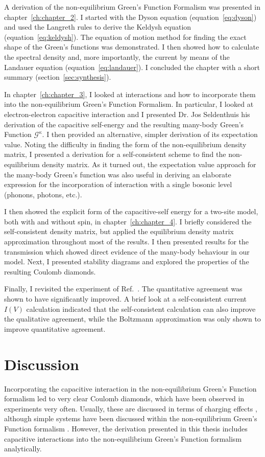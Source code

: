 A derivation of the non-equilibrium Green's Function Formalism was presented in chapter~\ref{ch:chapter_2}. I started with the Dyson equation (equation~\ref{eq:dyson}) and used the Langreth rules to derive the Keldysh equation (equation~\ref{eq:keldysh}). The equation of motion method for finding the exact shape of the Green's functions was demonstrated. I then showed how to calculate the spectral density and, more importantly, the current by means of the Landauer equation (equation~\ref{eq:landauer}). I concluded the chapter with a short summary (section~\ref{sec:synthesis}).

In chapter~\ref{ch:chapter_3}, I looked at interactions and how to incorporate them into the non\hyp{}equilibrium Green's Function Formalism. In particular, I looked at electron-electron capacitive interaction and I presented Dr. Jos Seldenthuis his derivation of the capacitive self-energy and the resulting many-body Green's Function $\mathscr{G}^\kappa$. I then provided an alternative, simpler derivation of its expectation value. Noting the difficulty in finding the form of the non-equilibrium density matrix, I presented a derivation for a self-consistent scheme to find the non-equilibrium density matrix. As it turned out, the expectation value approach for the many-body Green's function was also useful in deriving an elaborate expression for the incorporation of interaction with a single bosonic level (phonons, photons, etc.). 

I then showed the explicit form of the capacitive-self energy for a two-site model, both with and without spin, in chapter~\ref{ch:chapter_4}. I briefly considered the self-consistent density matrix, but applied the equilibrium density matrix approximation throughout most of the results. I then presented results for the transmission which showed direct evidence of the many-body behaviour in our model. Next, I presented stability diagrams and explored the properties of the resulting Coulomb diamonds. 

Finally, I revisited the experiment of Ref.~\cite{perrinnano}. The quantitative agreement was shown to have significantly improved. A brief look at a self-consistent current $I(V)$ calculation indicated that the self-consistent calculation can also improve the qualitative agreement, while the Boltzmann approximation was only shown to improve quantitative agreement.

\section{Discussion}
\label{sec:discussion}
Incorporating the capacitive interaction in the non-equilibrium Green's Function formalism led to very clear Coulomb diamonds, which have been observed in experiments very often. Usually, these are discussed in terms of charging effects \cite{seldenthuis, thijszantrev}, although simple systems have been discussed within the non-equilibrium Green's Function formalism \cite{haugjauho}. However, the derivation presented in this thesis includes capacitive interactions into the non-equilibrium Green's Function formalism analytically.

